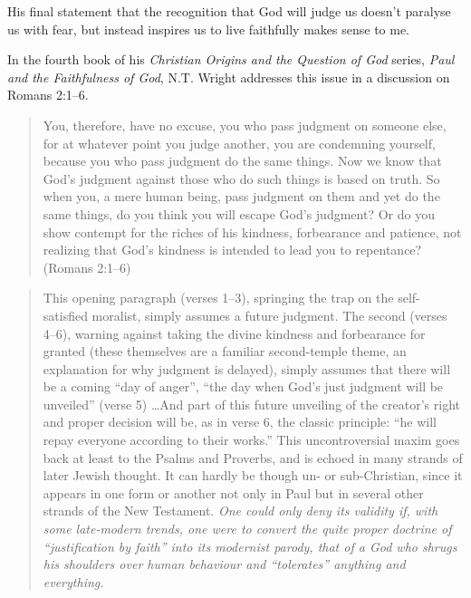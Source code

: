 His final statement that the recognition that God will judge us doesn't paralyse
us with fear, but instead inspires us to live faithfully makes sense to me.

In the fourth book of his \textit{Christian Origins and the Question of God}
series, \textit{Paul and the Faithfulness of God}, N.T. Wright addresses this
issue in a discussion on Romans 2:1--6.

\begin{quote}
    You, therefore, have no excuse, you who pass judgment on someone else, for
    at whatever point you judge another, you are condemning yourself, because
    you who pass judgment do the same things. Now we know that God's judgment
    against those who do such things is based on truth. So when you, a mere
    human being, pass judgment on them and yet do the same things, do you think
    you will escape God's judgment? Or do you show contempt for the riches of
    his kindness, forbearance and patience, not realizing that God's kindness is
    intended to lead you to repentance? (Romans 2:1--6)
\end{quote}

\begin{quote}
    This opening paragraph (verses 1--3), springing the trap on the
    self-satisfied moralist, simply assumes a future judgment. The second
    (verses 4--6), warning against taking the divine kindness and forbearance
    for granted (these themselves are a familiar second-temple theme, an
    explanation for why judgment is delayed), simply assumes that there will be
    a coming \enquote{day of anger}, \enquote{the day when God's just judgment
    will be unveiled} (verse 5) \dots And part of this future unveiling of the
    creator's right and proper decision will be, as in verse 6, the classic
    principle: \enquote{he will repay everyone according to their works.} This
    uncontroversial maxim goes back at least to the Psalms and Proverbs, and is
    echoed in many strands of later Jewish thought. It can hardly be though un-
    or sub-Christian, since it appears in one form or another not only in Paul
    but in several other strands of the New Testament. \emph{One could only deny
    its validity if, with some late-modern trends, one were to convert the quite
    proper doctrine of \enquote{justification by faith} into its modernist
    parody, that of a God who shrugs his shoulders over human behaviour and
    \enquote{tolerates} anything and everything.}
    \autocite[1086f]{wright:2013}
\end{quote}

